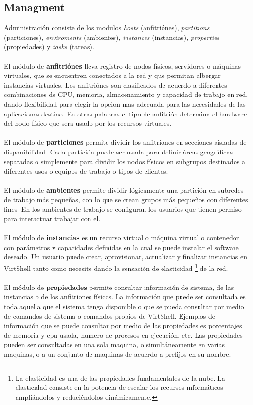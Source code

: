 \documentclass[conference, spanish]{IEEEtran}
\begin{document}
\subsection{Managment}
Administración consiste de los modulos \emph{hosts} (anfitriónes), \emph{partitions} (particiones), \emph{enviroments} (ambientes), \emph{instances} (instancias), \emph{properties} (propiedades) y \emph{tasks} (tareas). \\
\\
El módulo de \textbf{anfitriónes} lleva registro de nodos físicos, servidores o máquinas virtuales, que se encuentren conectados a la red y que permitan albergar instancias virtuales. Los anfitriónes son clasificados de acuerdo a diferentes combinaciones de CPU, memoria, almacenamiento y capacidad de trabajo en red, dando flexibilidad para elegir la opcion mas adecuada para las necesidades de las aplicaciones destino. En otras palabras el tipo de anfitrión determina el hardware del nodo físico que sera usado por los recursos virtuales.\\
\\
El módulo de \textbf{particiones} permite dividir los anfitriones en secciones aisladas de disponibilidad. Cada partición puede ser usada para definir áreas geográficas separadas o simplemente para dividir los nodos físicos en subgrupos destinados a diferentes usos o equipos de trabajo o tipos de clientes.\\
\\
El módulo de \textbf{ambientes} permite dividir lógicamente una partición en subredes de trabajo más pequeñas, con lo que se crean grupos más pequeños con diferentes fines. En los ambientes de trabajo se configuran los usuarios que tienen permiso para interactuar trabajar con el.\\
\\
El módulo de \textbf{instancias} es un recurso virtual o máquina virtual o contenedor con parámetros y capacidades definidas en la cual se puede instalar el software deseado. Un usuario puede crear, aprovisionar, actualizar y finalizar instancias en VirtShell tanto como necesite dando la sensación de elasticidad \footnote{La elasticidad es una de las propiedades fundamentales de la nube. La elasticidad consiste en la potencia de escalar los recursos informáticos ampliándolos y reduciéndolos dinámicamente.} de la red.\\
\\
El módulo de \textbf{propiedades} permite consultar información de sistema, de las instancias o de los anfitriones físicos. La información que puede ser consultada es toda aquella que el sistema tenga disponible o que se pueda consultar por medio de comandos de sistema o comandos propios de VirtShell. Ejemplos de información que se puede consultar por medio de las propiedades es porcentajes de memoria y cpu usada, numero de procesos en ejecución, etc. Las propiedades pueden ser consultadas en una sola maquina, o simultáneamente en varias maquinas, o a un conjunto de maquinas de acuerdo a prefijos en su nombre.\\
\end{document}
